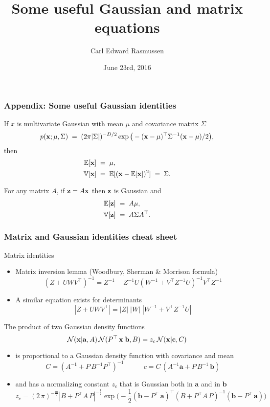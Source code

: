 

\title{Some useful Gaussian and matrix equations}
\author{Carl Edward Rasmussen}
\date{June 23rd, 2016}



\begin{frame}
\titlepage
\end{frame}

\begin{frame}
\frametitle{Appendix: Some useful Gaussian identities}
If $x$ is multivariate Gaussian with mean $\mu$ and
covariance matrix $\Sigma$
\[
p({\bf x}; \mu, \Sigma)\;=\;(2\pi|\Sigma|)^{-D/2}\exp\big(-({\bf
    x}-\mu)^\top\Sigma^{-1}({\bf x}-\mu)/2\big),
\]
then
\[
\begin{split}
\mathbb{E}[{\bf x}]\;&=\;\mu,\\
\mathbb{V}[{\bf x}]\;&=\;\mathbb{E}[({\bf x}-\mathbb{E}[{\bf x}])^2]\;=\;\Sigma.
\end{split}
\]

For any matrix $A$, if ${\bf z} = A{\bf x}$ then ${\bf z}$ is Gaussian and
\[
\begin{split}
\mathbb{E}[{\bf z}] \;&=\; A\mu,\\
\mathbb{V}[{\bf z}] \;&=\;A\Sigma A^\top.
\end{split}
\]
\end{frame}
\begin{frame}
\frametitle{Matrix and Gaussian identities cheat sheet}

Matrix identities
\begin{itemize}
\item Matrix inversion lemma (Woodbury, Sherman \& Morrison formula)
%
\[
(Z+UWV^\top)^{-1}=Z^{-1}-Z^{-1}U(W^{-1}+V^\top Z^{-1}U)^{-1}V^\top Z^{-1}
\]
%
\item A similar equation exists for determinants
\[
|Z+UWV^\top|=|Z|\;|W|\;|W^{-1}+V^\top Z^{-1}U|
\]
\end{itemize}

The product of two Gaussian density functions
%
\[
\mathcal{N}(\mathbf x|{\mathbf a},A)\,\mathcal{N}(P^\top\,\mathbf x|{\mathbf b},B) = z_c\,
\mathcal{N}(\mathbf x|{\mathbf c},C)
\]
%
\vspace{-5mm}
\begin{itemize}
\item is proportional to a Gaussian density function with covariance and mean
%
\[
C = \left(A^{-1}+P\,B^{-1}P^\top\right)^{-1}\enspace \hspace{1cm} c =
C\,\left(A^{-1}{\mathbf a}+P\,B^{-1}\,{\mathbf b}\right)
\]
%
\item and has a normalizing constant $z_c$ that is Gaussian both in ${\mathbf
a}$ and in ${\mathbf b}$ 
%
\[
z_c = (2\,\pi)^{-\frac{m}{2}}|B+P^\top A\,P|^{-\frac{1}{2}}
\exp\big(-\frac{1}{2}({\mathbf b}-P^\top\,{\mathbf a})^\top
\left(B+P^\top A\,P\right)^{-1}({\mathbf b}-P^\top\,{\mathbf a})
\big)
\]
%
\end{itemize}
\end{frame}



